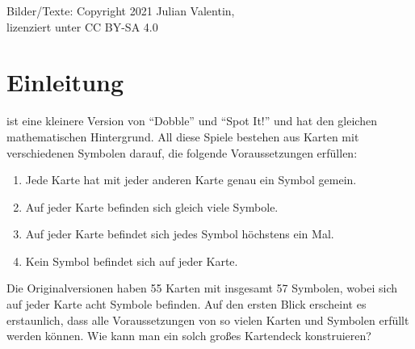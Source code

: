\documentclass[paper=81mm:81mm,fontsize=10.7pt]{scrartcl}
\begin{document}
\vspace*{\fill}

\noindent\hspace*{9mm}%

\vspace*{\fill}

{%
  \noindent\small%
  Bilder/Texte: Copyright \textcopyright{} 2021 Julian Valentin,\\
  lizenziert unter \doclicenseIcon{} CC BY-SA 4.0%
}

\pagebreak

\section*{Einleitung}

\theda{} ist eine kleinere Version von "`Dobble"' und "`Spot It!"' und hat den gleichen
mathematischen Hintergrund.
All diese Spiele bestehen aus Karten mit verschiedenen Symbolen darauf,
die folgende Voraussetzungen erfüllen:

\begin{enumerate}[label=G\arabic*.]
  \item
  Jede Karte hat mit jeder anderen Karte genau ein Symbol gemein.

  \item
  Auf jeder Karte befinden sich gleich viele Symbole.

  \item
  Auf jeder Karte befindet sich jedes Symbol höchstens ein Mal.

  \item
  Kein Symbol befindet sich auf jeder Karte.
\end{enumerate}

Die Originalversionen haben 55 Karten mit insgesamt 57 Symbolen,
wobei sich auf jeder Karte acht Symbole befinden.
Auf den ersten Blick erscheint es erstaunlich,
dass alle Voraussetzungen von so vielen Karten und Symbolen erfüllt werden können.
Wie kann man ein solch großes Kartendeck konstruieren?
\end{document}
